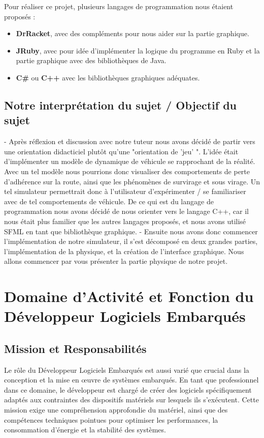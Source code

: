 \documentclass[a4paper,12pt]{report}
\begin{document}
Pour réaliser ce projet, plusieurs langages de programmation nous étaient proposés :
\begin{itemize}
    \item \textbf{DrRacket}, avec des compléments pour nous aider sur la partie graphique.
    \item \textbf{JRuby}, avec pour idée d'implémenter la logique du programme en Ruby et la partie graphique avec des bibliothèques de Java.
    \item \textbf{C\#} ou \textbf{C++} avec les bibliothèques graphiques adéquates.
\end{itemize}


\subsection{Notre interprétation du sujet / Objectif du sujet }
- Après réflexion et discussion avec notre tuteur nous avons décidé de partir vers une orientation didacticiel plutôt qu'une "orientation de 'jeu' ". L'idée était d'implémenter un modèle de dynamique de véhicule se rapprochant de la réalité. Avec un tel modèle nous pourrions donc visualiser des comportements de perte d'adhérence sur la route, ainsi que les phénomènes de survirage et sous virage. Un tel simulateur permettrait donc à l'utilisateur d'expérimenter / se familiariser avec de tel comportements de véhicule. De ce qui est du langage de programmation nous avons décidé de nous orienter vers le langage C++, car il nous était plus familier que les autres langages proposés, et nous avons utilisé SFML en tant que bibliothèque graphique.
- Ensuite nous avons donc commencer l'implémentation de notre simulateur, il s'est décomposé en deux grandes parties, l'implémentation de la physique, et la création de l'interface graphique. Nous allons commencer par vous présenter la partie physique de notre projet.

\section{Domaine d'Activité et Fonction du Développeur Logiciels Embarqués}

\subsection{Mission et Responsabilités}

Le rôle du Développeur Logiciels Embarqués est aussi varié que crucial dans la conception et la mise en œuvre de systèmes embarqués. En tant que professionnel dans ce domaine, le développeur est chargé de créer des logiciels spécifiquement adaptés aux contraintes des dispositifs matériels sur lesquels ils s'exécutent. Cette mission exige une compréhension approfondie du matériel, ainsi que des compétences techniques pointues pour optimiser les performances, la consommation d'énergie et la stabilité des systèmes.
\end{document}
